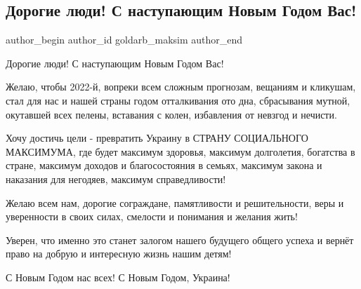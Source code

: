  
 
 
 
 
 
\subsection{Дорогие люди! С наступающим Новым Годом Вас!}
\label{sec:31_12_2021.fb.goldarb_maksim.1.s_novym_godom}
 
\ifcmt
 author_begin
   author_id goldarb_maksim
 author_end
\fi

Дорогие люди! С наступающим Новым Годом Вас! 


Желаю, чтобы 2022-й, вопреки всем сложным прогнозам, вещаниям и кликушам, стал
для нас и нашей страны годом отталкивания ото дна, сбрасывания мутной,
окутавшей всех пелены, вставания с колен, избавления от невзгод и нечисти. 

Хочу достичь цели - превратить Украину в СТРАНУ СОЦИАЛЬНОГО МАКСИМУМА, где
будет максимум здоровья, максимум долголетия, богатства в стране, максимум
доходов и благосостояния в семьях, максимум закона и наказания для негодяев,
максимум справедливости! 

Желаю всем нам, дорогие сограждане, памятливости и решительности, веры и
уверенности в своих силах, смелости и понимания и желания жить! 

Уверен, что именно это станет залогом нашего будущего общего успеха и вернёт
право на добрую и интересную жизнь нашим детям! 

С Новым Годом нас всех! С Новым Годом, Украина!
